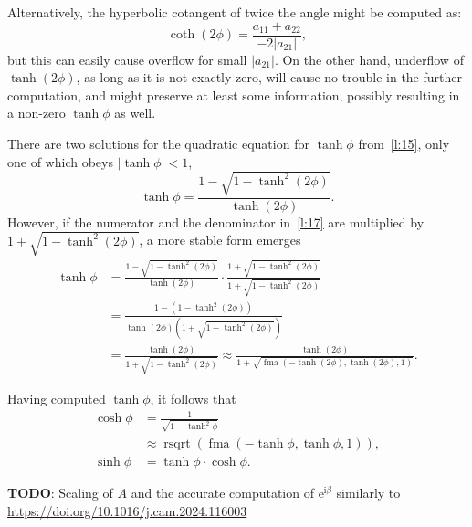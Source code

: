 \documentclass[a4paper,12pt,twoside]{article}
\begin{document}
Alternatively, the hyperbolic cotangent of twice the angle might be
computed as:
\begin{equation}
  \coth(2\phi)=\frac{a_{11}+a_{22}}{-2|a_{21}|},
  \label{l:16}
\end{equation}
but this can easily cause overflow for small $|a_{21}|$.  On the other
hand, underflow of $\tanh(2\phi)$, as long as it is not exactly zero,
will cause no trouble in the further computation, and might preserve
at least some information, possibly resulting in a non-zero
$\tanh\phi$ as well.

There are two solutions for the quadratic equation for $\tanh\phi$
from~\eqref{l:15}, only one of which obeys $|\tanh\phi|<1$,
\begin{equation}
  \tanh\phi=\frac{1-\sqrt{1-\tanh^2(2\phi)}}{\tanh(2\phi)}.
  \label{l:17}
\end{equation}
However, if the numerator and the denominator in~\eqref{l:17} are
multiplied by $1+\sqrt{1-\tanh^2(2\phi)}$, a more stable form emerges
\begin{equation}
  \begin{aligned}
    \tanh\phi&=\frac{1-\sqrt{1-\tanh^2(2\phi)}}{\tanh(2\phi)}\cdot\frac{1+\sqrt{1-\tanh^2(2\phi)}}{1+\sqrt{1-\tanh^2(2\phi)}}\\
    &=\frac{1-(1-\tanh^2(2\phi))}{\tanh(2\phi)\left(1+\sqrt{1-\tanh^2(2\phi)}\right)}\\
    &=\frac{\tanh(2\phi)}{1+\sqrt{1-\tanh^2(2\phi)}}\approx\frac{\tanh(2\phi)}{1+\sqrt{\mathop{\mathrm{fma}}(-\tanh(2\phi),\tanh(2\phi),1)}}.
  \end{aligned}
  \label{l:18}
\end{equation}

Having computed $\tanh\phi$, it follows that
\begin{equation}
  \begin{aligned}
    \cosh\phi&=\frac{1}{\sqrt{1-\tanh^2\phi}}\\
    &\approx\mathop{\mathrm{rsqrt}}(\mathop{\mathrm{fma}}(-\tanh\phi,\tanh\phi,1)),\\
    \sinh\phi&=\tanh\phi\cdot\cosh\phi.
  \end{aligned}
  \label{l:19}
\end{equation}

\textbf{TODO}: Scaling of $A$ and the accurate computation of
$\mathrm{e}^{\mathrm{i}\beta}$ similarly to
\url{https://doi.org/10.1016/j.cam.2024.116003}
\end{document}
